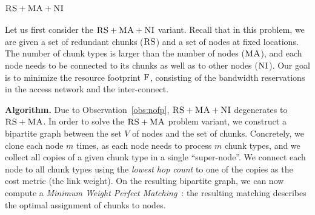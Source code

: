 \documentclass[conference,10pt]{IEEEtran}
\newcommand{\MaFactor}{m}
\newcommand{\ChunkType}{\tau}
\newcommand{\VirtualNodes}{\ensuremath{V}}
\newcommand{\CC}{\textsc{NI}}
\newcommand{\RS}{\textsc{RS}}
\newcommand{\MA}{\textsc{MA}}
\newcommand{\Cost}{\textsc{F}}
\begin{document}
\subsubsection{$\RS+\MA+\CC$}

Let us first consider the $\RS+\MA+\CC$ variant.
Recall that in this problem,
we are given a set of redundant chunks ($\RS$) and a set of nodes
at fixed locations. The number of chunk types is larger than the number
of nodes ($\MA$), and each node needs to be connected
to its chunks as well as to other nodes ($\CC$).
Our goal is to minimize the resource footprint $\Cost$, consisting
of the bandwidth reservations in the access network and the inter-connect.

\textbf{Algorithm.} Due to Observation~\ref{obs:nofp}, $\RS+\MA+\CC$ degenerates to $\RS+\MA$.
In order to solve the $\RS+\MA$ problem variant,
we construct a bipartite
graph between the set
$\VirtualNodes$ of nodes and
the set of chunks.
Concretely, we clone each node $\MaFactor$ times,
as each node needs to process
$\MaFactor$ chunk types, and we collect all copies of a given chunk type in a
single %
``super-node''. We connect each node to all chunk types using the
\emph{lowest hop count} to one of the copies as the cost metric (the link weight).
On the resulting bipartite graph, we can now compute a \emph{Minimum Weight
Perfect
Matching}~\cite{gabow_scaling_algorithm}:
the resulting matching describes the optimal assignment of chunks to nodes.

\end{document}

